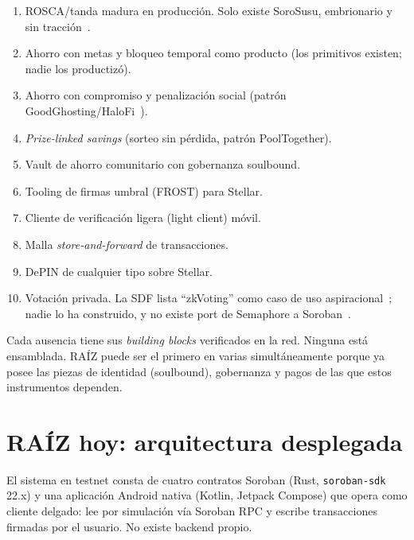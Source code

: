 \documentclass[twocolumn,10pt]{article}
\begin{document}
\begin{enumerate}[label=\textbf{G\arabic*.}]
\item ROSCA/tanda madura en producci\'on. Solo existe SoroSusu, embrionario y sin tracci\'on~\cite{sorosusu}.
\item Ahorro con metas y bloqueo temporal como producto (los primitivos existen; nadie los productiz\'o).
\item Ahorro con compromiso y penalizaci\'on social (patr\'on GoodGhosting/HaloFi~\cite{goodghosting}).
\item \emph{Prize-linked savings} (sorteo sin p\'erdida, patr\'on PoolTogether).
\item Vault de ahorro comunitario con gobernanza soulbound.
\item Tooling de firmas umbral (FROST) para Stellar.
\item Cliente de verificaci\'on ligera (light client) m\'ovil.
\item Malla \emph{store-and-forward} de transacciones.
\item DePIN de cualquier tipo sobre Stellar.
\item Votaci\'on privada. La SDF lista ``zkVoting'' como caso de uso aspiracional~\cite{zk5}; nadie lo ha construido, y no existe port de Semaphore a Soroban~\cite{semaphore}.
\end{enumerate}

Cada ausencia tiene sus \emph{building blocks} verificados en la red. Ninguna est\'a ensamblada. RA\'IZ puede ser el primero en varias simult\'aneamente porque ya posee las piezas de identidad (soulbound), gobernanza y pagos de las que estos instrumentos dependen.

\section{RA\'IZ hoy: arquitectura desplegada}
\label{sec:actual}

El sistema en testnet consta de cuatro contratos Soroban (Rust, \texttt{soroban-sdk} 22.x) y una aplicaci\'on Android nativa (Kotlin, Jetpack Compose) que opera como cliente delgado: lee por simulaci\'on v\'ia Soroban RPC y escribe transacciones firmadas por el usuario. No existe backend propio.
\end{document}
